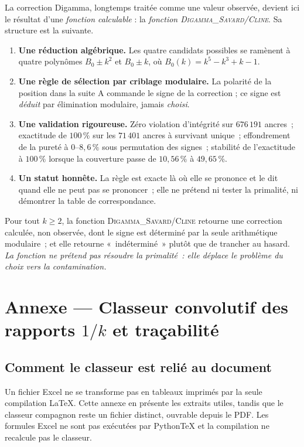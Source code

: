 \documentclass[11pt,a4paper]{article}
\begin{document}
La correction Digamma, longtemps traitée comme une valeur observée,
devient ici le résultat d'une \emph{fonction calculable} : la
\emph{fonction \textsc{Digamma\_Savard/Cline}}. Sa structure est la
suivante.

\begin{enumerate}[nosep,leftmargin=*]
  \item \textbf{Une réduction algébrique.} Les quatre candidats
    possibles se ramènent à quatre polynômes
    $B_0 \pm k^{2}$ et $B_0 \pm k$, où
    $B_0(k) = k^{5}-k^{3}+k-1$.
  \item \textbf{Une règle de sélection par criblage modulaire.} La
    polarité de la position dans la suite A commande le signe de la
    correction ; ce signe est \emph{déduit} par élimination
    modulaire, jamais \emph{choisi}.
  \item \textbf{Une validation rigoureuse.} Zéro violation
    d'intégrité sur $676\,191$ ancres~; exactitude de $100\,\%$ sur
    les $71\,401$ ancres à survivant unique~; effondrement de la
    pureté à $0$--$8{,}6\,\%$ sous permutation des signes~; stabilité
    de l'exactitude à $100\,\%$ lorsque la couverture passe de
    $10{,}56\,\%$ à $49{,}65\,\%$.
  \item \textbf{Un statut honnête.} La règle est exacte là où elle se
    prononce et le dit quand elle ne peut pas se prononcer~; elle ne
    prétend ni tester la primalité, ni démontrer la table de
    correspondance.
\end{enumerate}

\vspace{0.3cm}
\begin{boiteformule}
Pour tout $k \ge 2$, la fonction \textsc{Digamma\_Savard/Cline} retourne
une correction calculée, non observée, dont le signe est déterminé par
la seule arithmétique modulaire~; et elle retourne «~indéterminé~»
plutôt que de trancher au hasard. \emph{La fonction ne prétend pas
résoudre la primalité~: elle déplace le problème du \emph{choix} vers
la \emph{contamination}.}
\end{boiteformule}



\clearpage
\appendix
\section{Annexe --- Classeur convolutif des rapports $1/k$ et traçabilité}

\subsection{Comment le classeur est relié au document}
Un fichier Excel ne se transforme pas en tableaux imprimés par la seule
compilation LaTeX. Cette annexe en présente les extraits utiles, tandis que le
classeur compagnon reste un fichier distinct, ouvrable depuis le PDF. Les
formules Excel ne sont pas exécutées par PythonTeX et la compilation ne
recalcule pas le classeur.
\end{document}
